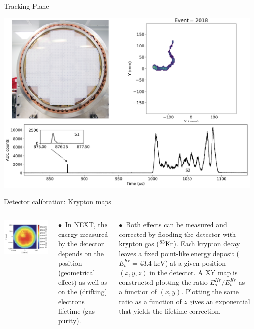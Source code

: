 \documentclass [aspectratio=169]{beamer}
\newcommand{\KR}{\ensuremath{{}^{83}{\rm Kr}}}
\begin{document}
\begin{frame}{Tracking Plane}

\includegraphics[scale=0.25]{trackinPlane.png}

\end{frame}



\begin{frame}{Detector calibration: Krypton maps}

\begin{columns}
\includegraphics[scale=0.31]{krmaps.png}

$\bullet~$ In NEXT, the energy measured by the detector depends on the position (geometrical effect) as well as on the (drifting) electrons lifetime (gas purity). 

$\bullet~$ Both effects can be measured and corrected by flooding the detector with krypton gas (\KR). Each krypton decay leaves a fixed point-like energy deposit ($E_t^{Kr} =43.4$ keV) at a given position $(x,y,z)$ in the detector. A XY map is constructed plotting the ratio $E_o^{Kr}/E_t^{Kr}$ as a function of $(x,y)$. Plotting the same ratio as a function of $z$ gives an exponential that yields the lifetime correction.  
\end{columns}
\end{frame}
\end{document}
